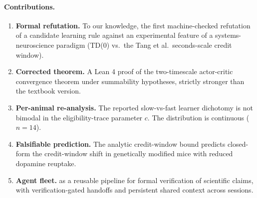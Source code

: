\paragraph{Contributions.}
\begin{enumerate}[leftmargin=1.5em,itemsep=0.1em]
\item \textbf{Formal refutation.} To our knowledge, the first machine-checked
  refutation of a candidate learning rule against an experimental
  feature of a systems-neuroscience paradigm (TD(0) vs.\ the
  Tang et al.\ seconds-scale credit window).
\item \textbf{Corrected theorem.} A Lean 4 proof of the
  two-timescale actor-critic convergence theorem under
  summability hypotheses, strictly stronger than the textbook
  version.
\item \textbf{Per-animal re-analysis.} The reported slow-vs-fast
  learner dichotomy is not bimodal in the eligibility-trace
  parameter $c$. The distribution is continuous ($n=14$).
\item \textbf{Falsifiable prediction.} The analytic credit-window
  bound predicts closed-form the credit-window shift in
  genetically modified mice with reduced dopamine reuptake.
\item \textbf{Agent fleet.} \sys{} as a reusable pipeline for
  formal verification of scientific claims, with verification-gated
  handoffs and persistent shared context across sessions.
\end{enumerate}
